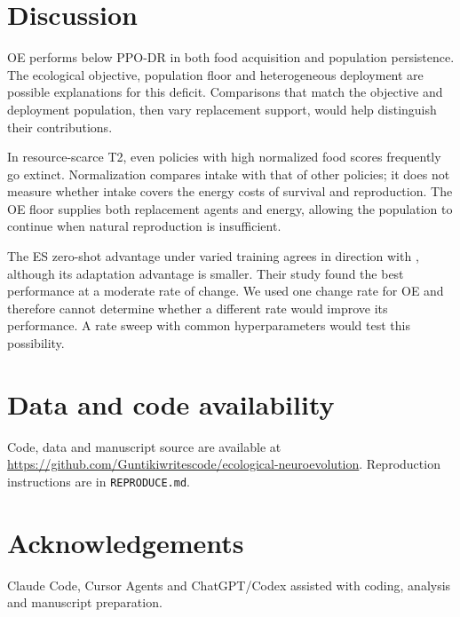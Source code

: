 \FloatBarrier
\section{Discussion}
OE performs below PPO-DR in both food acquisition and population persistence. The ecological objective, population floor and heterogeneous deployment are possible explanations for this deficit. Comparisons that match the objective and deployment population, then vary replacement support, would help distinguish their contributions.

In resource-scarce T2, even policies with high normalized food scores frequently go extinct. Normalization compares intake with that of other policies; it does not measure whether intake covers the energy costs of survival and reproduction. The OE floor supplies both replacement agents and energy, allowing the population to continue when natural reproduction is insufficient.

The ES zero-shot advantage under varied training agrees in direction with \citet{milano2019moderate}, although its adaptation advantage is smaller. Their study found the best performance at a moderate rate of change. We used one change rate for OE and therefore cannot determine whether a different rate would improve its performance. A rate sweep with common hyperparameters would test this possibility.

\section*{Data and code availability}
Code, data and manuscript source are available at \url{https://github.com/Guntikiwritescode/ecological-neuroevolution}. Reproduction instructions are in \texttt{REPRODUCE.md}.

\section*{Acknowledgements}
Claude Code, Cursor Agents and ChatGPT/Codex assisted with coding, analysis and manuscript preparation.
